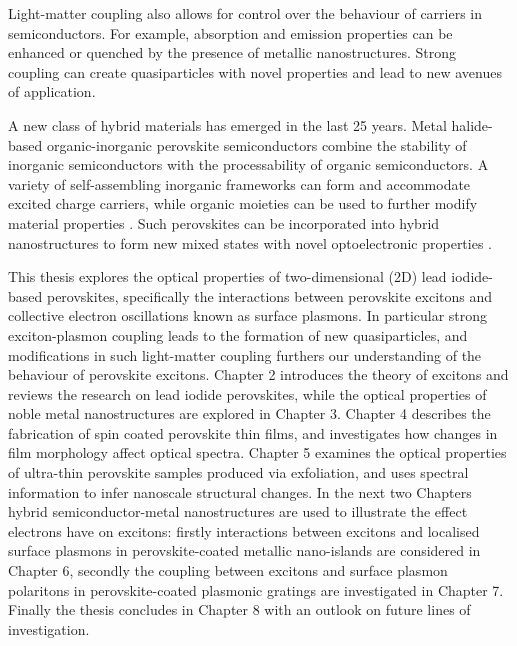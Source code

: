 Light-matter coupling also allows for control over the behaviour of carriers in semiconductors. For example, absorption and emission properties can be enhanced \cite{Balci2014, Alemu2014, Zheng2011, Xu2013, Spinelli2012} or quenched \cite{Raikar2011, Samanta2014, Bhanu2014} by the presence of metallic nanostructures. Strong coupling can create quasiparticles with novel properties \cite{Kasprzak2006, Christopoulos2007, Amo2010} and lead to new avenues of application.

A new class of hybrid materials has emerged in the last 25 years. Metal halide-based organic-inorganic perovskite semiconductors combine the stability of inorganic semiconductors with the processability of organic semiconductors. A variety of self-assembling inorganic frameworks can form and accommodate excited charge carriers, while organic moieties can be used to further modify material properties \cite{Cheng2010, Ishihara1990, Mitzi2001, Mitzi2001c, Nagami1996, Pradeesh2010, Pradeesh2009a, Lee2012, Heo2013, Liu2013, Hao2014}. Such perovskites can be incorporated into hybrid nanostructures to form new mixed states with novel optoelectronic properties \cite{Fujita1998, Fujita1999, Fujita2000, Ishi-Hayase2003, Brehier2006, Lanty2008, Pradeesh2009b, Sumioka2001}.

This thesis explores the optical properties of two-dimensional (2D) lead iodide-based perovskites, specifically the interactions between perovskite excitons and collective electron oscillations known as surface plasmons. In particular strong exciton-plasmon coupling leads to the formation of new quasiparticles, and modifications in such light-matter coupling furthers our understanding of the behaviour of perovskite excitons. Chapter 2 introduces the theory of excitons and reviews the research on lead iodide perovskites, while the optical properties of noble metal nanostructures are explored in Chapter 3. Chapter 4 describes the fabrication of spin coated perovskite thin films, and investigates how changes in film morphology affect optical spectra. Chapter 5 examines the optical properties of ultra-thin perovskite samples produced via exfoliation, and uses spectral information to infer nanoscale structural changes. In the next two Chapters hybrid semiconductor-metal nanostructures are used to illustrate the effect electrons have on excitons: firstly interactions between excitons and localised surface plasmons in perovskite-coated metallic nano-islands are considered in Chapter 6, secondly the coupling between excitons and surface plasmon polaritons in perovskite-coated plasmonic gratings are investigated in Chapter 7. Finally the thesis concludes in Chapter 8 with an outlook on future lines of investigation.